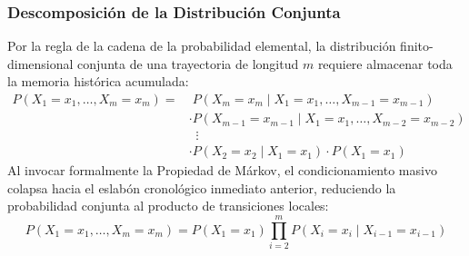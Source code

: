 \subsubsection{Descomposición de la Distribución Conjunta}
\noindent
Por la regla de la cadena de la probabilidad elemental, la distribución finito-dimensional conjunta de una trayectoria de longitud $m$ requiere almacenar toda la memoria histórica acumulada:
\begin{align*}
    P(X_1 = x_1, \dots, X_m = x_m) = & \; P(X_m = x_m \mid X_1 = x_1, \dots, X_{m-1} = x_{m-1}) \\
    & \cdot P(X_{m-1} = x_{m-1} \mid X_1 = x_1, \dots, X_{m-2} = x_{m-2}) \\
    & \;\; \vdots \\
    & \cdot P(X_2 = x_2 \mid X_1 = x_1) \cdot P(X_1 = x_1)
\end{align*}
Al invocar formalmente la Propiedad de Márkov, el condicionamiento masivo colapsa hacia el eslabón cronológico inmediato anterior, reduciendo la probabilidad conjunta al producto de transiciones locales:
\begin{equation*}
    P(X_1 = x_1, \dots, X_m = x_m) = P(X_1 = x_1) \prod_{i=2}^{m} P(X_i = x_i \mid X_{i-1} = x_{i-1})
\end{equation*}

